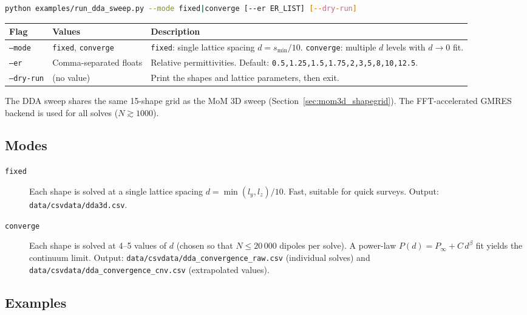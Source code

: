 \documentclass[a4paper,11pt]{article}
\begin{document}
\begin{lstlisting}[language=bash]
python examples/run_dda_sweep.py --mode fixed|converge [--er ER_LIST] [--dry-run]
\end{lstlisting}

\begin{center}
\begin{tabular}{@{}llp{5.5cm}@{}}
\toprule
Flag & Values & Description \\
\midrule
\texttt{--mode} & \texttt{fixed}, \texttt{converge}
    & \texttt{fixed}: single lattice spacing $d = s_{\min}/10$.
      \texttt{converge}: multiple $d$ levels with $d \to 0$ fit. \\
\texttt{--er} & Comma-separated floats
    & Relative permittivities.
      Default: \texttt{0.5,1.25,1.5,1.75,2,3,5,8,10,12.5}. \\
\texttt{--dry-run} & (no value)
    & Print the shapes and lattice parameters, then exit. \\
\bottomrule
\end{tabular}
\end{center}

The DDA sweep shares the same 15-shape grid as the MoM 3D sweep
(Section~\ref{sec:mom3d_shapegrid}).  The FFT-accelerated GMRES backend is
used for all solves ($N \gtrsim 1000$).

\subsection{Modes}

\begin{description}
    \item[\texttt{fixed}] Each shape is solved at a single lattice spacing
        $d = \min(l_y, l_z) / 10$.  Fast, suitable for quick surveys.
        Output: \texttt{data/csvdata/dda3d.csv}.

    \item[\texttt{converge}] Each shape is solved at 4--5 values of $d$
        (chosen so that $N \le 20\,000$ dipoles per solve).  A power-law
        $P(d) = P_\infty + C\, d^\beta$ fit yields the continuum limit.
        Output:
        \texttt{data/csvdata/dda\_convergence\_raw.csv} (individual solves) and
        \texttt{data/csvdata/dda\_convergence\_cnv.csv} (extrapolated values).
\end{description}

\subsection{Examples}
\end{document}
